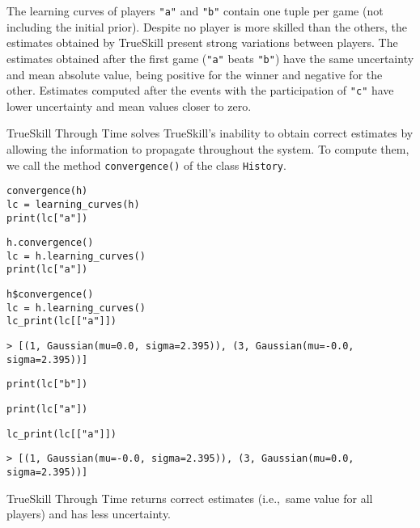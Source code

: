 \documentclass[article]{jss}
\begin{document}
%
The learning curves of players \texttt{"a"} and \texttt{"b"} contain one tuple per game (not including the initial prior). 
Despite no player is more skilled than the others, the estimates obtained by TrueSkill present strong variations between players. 
The estimates obtained after the first game (\texttt{"a"} beats \texttt{"b"}) have the same uncertainty and mean absolute value, being positive for the winner and negative for the other. 
Estimates computed after the events with the participation of \texttt{"c"} have lower uncertainty and mean values closer to zero. 


TrueSkill Through Time solves TrueSkill's inability to obtain correct estimates by allowing the information to propagate throughout the system. 
To compute them, we call the method \texttt{convergence()} of the class \texttt{History}. 
%
\begin{paracol}{3}
\begin{lstlisting}[backgroundcolor=\color{julia!60}, belowskip=-0.77 \baselineskip]
convergence(h)
lc = learning_curves(h)
print(lc["a"])
\end{lstlisting}
  \switchcolumn
\begin{lstlisting}[backgroundcolor=\color{python!60}, belowskip=-0.77 \baselineskip]
h.convergence()
lc = h.learning_curves()
print(lc["a"])
\end{lstlisting}
   \switchcolumn
\begin{lstlisting}[backgroundcolor=\color{r!50}, belowskip=-0.77 \baselineskip]
h$convergence()
lc = h.learning_curves()
lc_print(lc[["a"]])
\end{lstlisting}
\end{paracol}
\begin{lstlisting}[backgroundcolor=\color{all}, belowskip=-0.77 \baselineskip]
> [(1, Gaussian(mu=0.0, sigma=2.395)), (3, Gaussian(mu=-0.0, sigma=2.395))]
\end{lstlisting}
\begin{paracol}{3}
\begin{lstlisting}[backgroundcolor=\color{julia!60}, belowskip=-0.77 \baselineskip]
print(lc["b"])
\end{lstlisting}
  \switchcolumn
\begin{lstlisting}[backgroundcolor=\color{python!60}, belowskip=-0.77 \baselineskip]
print(lc["a"])
\end{lstlisting}
   \switchcolumn
\begin{lstlisting}[backgroundcolor=\color{r!50}, belowskip=-0.77 \baselineskip]
lc_print(lc[["a"]])
\end{lstlisting}
\end{paracol}
\begin{lstlisting}[captionpos=b,backgroundcolor=\color{all},label=lst:ttt, caption={Computing TrueSkill Through Time learning curves.},belowskip=0cm]
> [(1, Gaussian(mu=-0.0, sigma=2.395)), (3, Gaussian(mu=0.0, sigma=2.395))]
\end{lstlisting}
%
TrueSkill Through Time returns correct estimates (i.e.,~same value for all players) and has less uncertainty. 
\end{document}
